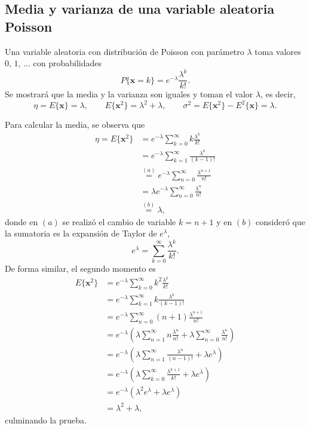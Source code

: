 \documentclass[a4paper]{report}
\newcommand{\x}{\mathbf{x}}
\begin{document}
\subsection{Media y varianza de una variable aleatoria Poisson}\label{sec:poisson_rv_mean_variance}

Una variable aleatoria con distribución de Poisson con parámetro \(\lambda\) toma valores \(0,\,1,\,\dots\) con probabilidades
\[
 P\{\x=k\}=e^{-\lambda}\frac{\lambda^k}{k!}.
\]
Se mostrará que la media y la varianza son iguales y toman el valor \(\lambda\), es decir,
\[
 \eta=E\{\x\}=\lambda,\qquad E\{\x^2\}=\lambda^2+\lambda,\qquad \sigma^2=E\{\x^2\}-E^2\{\x\}=\lambda.
\]

Para calcular la media, se observa que 
\begin{align*}
 \eta=E\{\x^2\}&=e^{-\lambda}\sum_{k=0}^\infty k\frac{\lambda^k}{k!}\\
   &=e^{-\lambda}\sum_{k=1}^\infty \frac{\lambda^k}{(k-1)!}\\
   &\overset{(a)}{=}e^{-\lambda}\sum_{n=0}^\infty \frac{\lambda^{n+1}}{n!}\\
   &=\lambda e^{-\lambda}\sum_{n=0}^\infty \frac{\lambda^n}{n!}\\
   &\overset{(b)}{=}\lambda,
\end{align*}
donde en \((a)\) se realizó el cambio de variable \(k=n+1\) y en \((b)\) consideró que la sumatoria es la expansión de Taylor de \(e^\lambda\),
\[
 e^\lambda=\sum_{k=0}^\infty \frac{\lambda^k}{k!}.
\]
De forma similar, el segundo momento es
\begin{align*}
 E\{\x^2\}&=e^{-\lambda}\sum_{k=0}^\infty k^2\frac{\lambda^k}{k!}\\
   &=e^{-\lambda}\sum_{k=1}^\infty k\frac{\lambda^k}{(k-1)!}\\
   &=e^{-\lambda}\sum_{n=0}^\infty(n+1)\frac{\lambda^{n+1}}{n!}\\
   &=e^{-\lambda}\left(\lambda\sum_{n=1}^\infty n\frac{\lambda^n}{n!}+\lambda\sum_{n=0}^\infty \frac{\lambda^n}{n!}\right)\\
   &=e^{-\lambda}\left(\lambda\sum_{n=1}^\infty\frac{\lambda^n}{(n-1)!}+\lambda e^{\lambda}\right)\\
   &=e^{-\lambda}\left(\lambda\sum_{k=0}^\infty\frac{\lambda^{k+1}}{k!}+\lambda e^{\lambda}\right)\\
   &=e^{-\lambda}\left(\lambda^2e^{\lambda}+\lambda e^{\lambda}\right)\\
   &=\lambda^2+\lambda,
\end{align*}
culminando la prueba.
\end{document}

